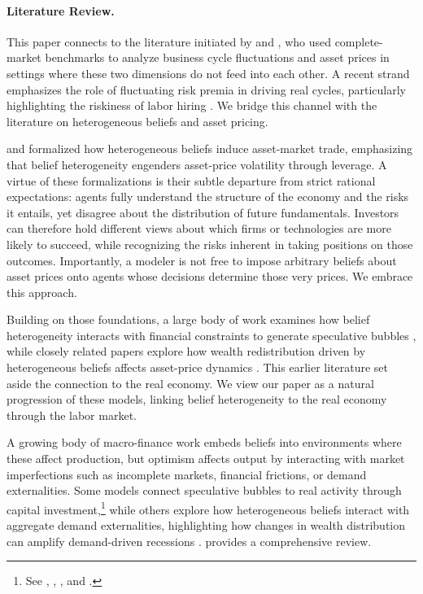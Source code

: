 \paragraph{Literature Review.}

This paper connects to the literature initiated by \citet{KP82} and \citet{MP85}, who used complete-market benchmarks to analyze business cycle fluctuations and asset prices in settings where these two dimensions do not feed into each other. A recent strand emphasizes the role of fluctuating risk premia in driving real cycles, particularly highlighting the riskiness of labor hiring \citep[e.g.,][]{H17, BB19, DH19, KLMP19}. We bridge this channel with the literature on heterogeneous beliefs and asset pricing.

\citet{HK78} and \citet{SX03} formalized how heterogeneous beliefs induce asset-market trade, emphasizing that belief heterogeneity engenders asset-price volatility through leverage. A virtue of these formalizations is their subtle departure from strict rational expectations: agents fully understand the structure of the economy and the risks it entails, yet disagree about the distribution of future fundamentals. Investors can therefore hold different views about which firms or technologies are more likely to succeed, while recognizing the risks inherent in taking positions on those outcomes. Importantly, a modeler is not free to impose arbitrary beliefs about asset prices onto agents whose decisions determine those very prices. We embrace this approach. 

Building on those foundations, a large body of work examines how belief heterogeneity interacts with financial constraints to generate speculative bubbles \citep[e.g.,][]{G03, FG08, G10, S13, INS18, barlevy2014leverage, barlevy2022speculative}, while closely related papers explore how wealth redistribution driven by heterogeneous beliefs affects asset-price dynamics \citep{DM94, XY09, KS12, wr2022sentiment}. This earlier literature set aside the connection to the real economy. We view our paper as a natural progression of these models, linking belief heterogeneity to the real economy through the labor market.

A growing body of macro-finance work embeds beliefs into environments where these affect production, but optimism affects output by interacting with market imperfections such as incomplete markets, financial frictions, or demand externalities. Some models connect speculative bubbles to real activity through capital investment,\footnote{See \cite{GHH05}, \cite{BSX06}, \cite{P05}, and \cite{BDUV16}.} while others explore how heterogeneous beliefs interact with aggregate demand externalities, highlighting how changes in wealth distribution can amplify demand-driven recessions \citep{CS19, CS20, guerreiro2022disagreement, CS24}. \citet{simsek2021macroeconomics} provides a comprehensive review.

